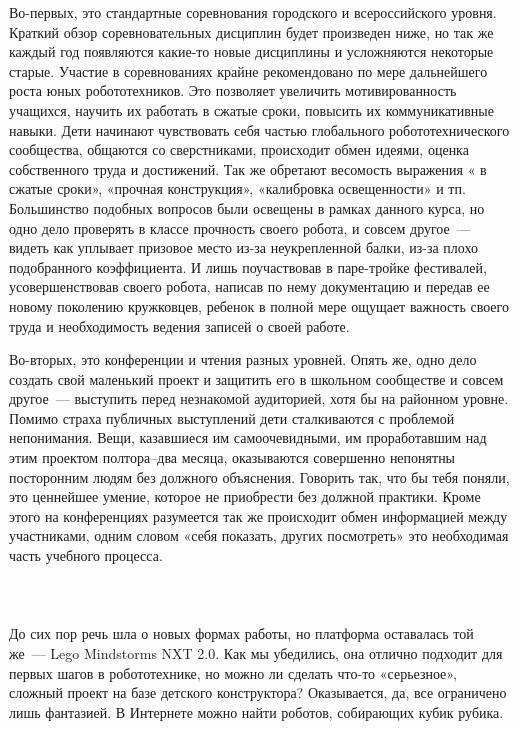 Во-первых, это стандартные соревнования  городского и всероссийского уровня. Краткий обзор соревновательных дисциплин будет произведен ниже, но так же каждый год появляются какие-то новые дисциплины и усложняются некоторые старые. Участие в соревнованиях крайне рекомендовано по мере дальнейшего роста юных робототехников. Это позволяет увеличить мотивированность учащихся, научить их работать в сжатые сроки, повысить их коммуникативные навыки. Дети начинают чувствовать себя частью глобального робототехнического сообщества, общаются со сверстниками, происходит обмен идеями, оценка собственного труда и достижений. Так же обретают весомость выражения « в сжатые сроки», «прочная конструкция», «калибровка освещенности» и тп. Большинство подобных вопросов были освещены в рамках данного курса, но одно дело проверять в классе прочность своего робота, и совсем другое~--- видеть как уплывает призовое место из-за неукрепленной балки, из-за плохо подобранного коэффициента. И лишь поучаствовав в паре-тройке фестивалей, усовершенствовав своего робота, написав по нему документацию и передав ее новому поколению кружковцев, ребенок в полной мере ощущает важность своего труда и необходимость ведения записей о своей работе.

Во-вторых, это конференции и чтения разных уровней. Опять же, одно дело создать свой маленький проект и защитить его в школьном сообществе и совсем другое~--- выступить перед незнакомой аудиторией, хотя бы на районном уровне. Помимо страха публичных выступлений дети сталкиваются с проблемой непонимания. Вещи, казавшиеся им самоочевидными, им проработавшим над этим проектом полтора--два месяца, оказываются совершенно непонятны посторонним людям без должного объяснения. Говорить так, что бы тебя поняли, это ценнейшее умение, которое не приобрести без должной практики. Кроме этого на конференциях разумеется так же происходит обмен информацией между участниками, одним словом «себя показать, других посмотреть» это необходимая часть учебного процесса.\\\\

{\hypertarget{lesson30x2}{}}\\\\

До сих пор речь шла о новых формах работы, но платформа оставалась той же~--- Lego Mindstorms NXT 2.0. Как мы убедились, она отлично подходит для первых шагов в робототехнике, но можно ли сделать что-то «серьезное», сложный проект на базе детского конструктора? Оказывается, да, все ограничено лишь фантазией.
\clearpage
В Интернете можно найти роботов, собирающих кубик рубика.

